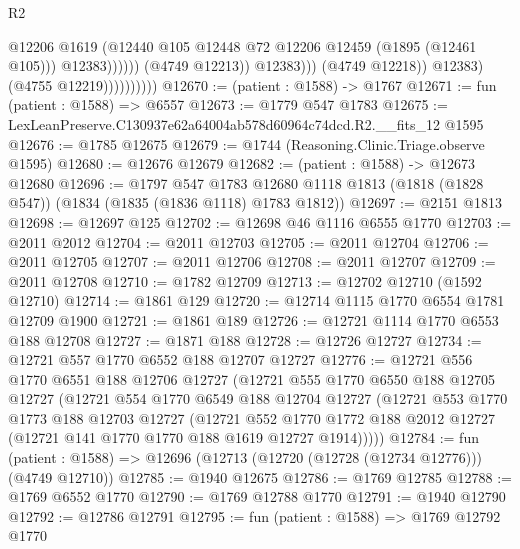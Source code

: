 \begin{lexlean}{R2}
\begin{coremodule}
                                              @12206
                                              @1619
                                              (@12440
                                                @105
                                                @12448
                                                @72
                                                @12206
                                                @12459
                                                (@1895 (@12461 @105)))
                                              @12383))))))
                                  (@4749 @12213))
                                @12383)))
                          (@4749 @12218))
                        @12383)
                      (@4755 @12219))))))))))
@12670 := (patient : @1588) -> @1767
@12671 := fun (patient : @1588) => @6557
@12673 := @1779 @547 @1783
@12675 := LexLeanPreserve.C130937e62a64004ab578d60964c74dcd.R2.__fits_12 @1595
@12676 := @1785 @12675
@12679 := @1744 (Reasoning.Clinic.Triage.observe @1595)
@12680 := @12676 @12679
@12682 := (patient : @1588) -> @12673 @12680
@12696 := @1797
    @547
    @1783
    @12680
    @1118
    @1813
    (@1818 (@1828 @547))
    (@1834 (@1835 (@1836 @1118) @1783 @1812))
@12697 := @2151 @1813
@12698 := @12697 @125
@12702 := @12698 @46 @1116 @6555 @1770
@12703 := @2011 @2012
@12704 := @2011 @12703
@12705 := @2011 @12704
@12706 := @2011 @12705
@12707 := @2011 @12706
@12708 := @2011 @12707
@12709 := @2011 @12708
@12710 := @1782 @12709
@12713 := @12702 @12710 (@1592 @12710)
@12714 := @1861 @129
@12720 := @12714 @1115 @1770 @6554 @1781 @12709 @1900
@12721 := @1861 @189
@12726 := @12721 @1114 @1770 @6553 @188 @12708
@12727 := @1871 @188
@12728 := @12726 @12727
@12734 := @12721 @557 @1770 @6552 @188 @12707 @12727
@12776 := @12721
    @556
    @1770
    @6551
    @188
    @12706
    @12727
    (@12721
      @555
      @1770
      @6550
      @188
      @12705
      @12727
      (@12721
        @554
        @1770
        @6549
        @188
        @12704
        @12727
        (@12721
          @553
          @1770
          @1773
          @188
          @12703
          @12727
          (@12721
            @552
            @1770
            @1772
            @188
            @2012
            @12727
            (@12721 @141 @1770 @1770 @188 @1619 @12727 @1914)))))
@12784 := fun (patient : @1588) => @12696 (@12713 (@12720 (@12728 (@12734 @12776))) (@4749 @12710))
@12785 := @1940 @12675
@12786 := @1769 @12785
@12788 := @1769 @6552 @1770
@12790 := @1769 @12788 @1770
@12791 := @1940 @12790
@12792 := @12786 @12791
@12795 := fun (patient : @1588) => @1769 @12792 @1770

\end{coremodule}
\end{lexlean}
